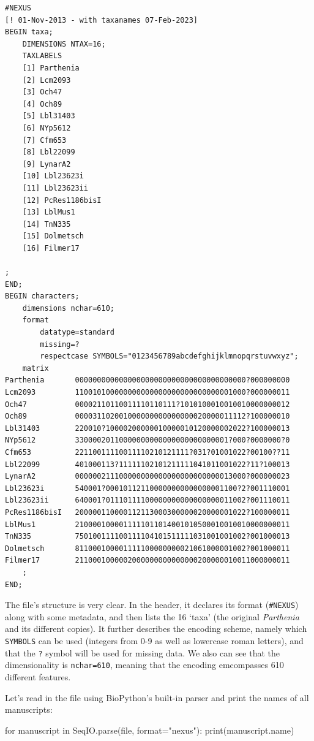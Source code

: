 \documentclass[
  a4paperpaper,
  ,captions=tableheading
]{scrbook}
\newenvironment{Shaded}{\begin{snugshade}}{\end{snugshade}}
\newcommand{\BuiltInTok}[1]{\textcolor[rgb]{0.00,0.23,0.31}{#1}}
\newcommand{\ControlFlowTok}[1]{\textcolor[rgb]{0.00,0.23,0.31}{#1}}
\newcommand{\KeywordTok}[1]{\textcolor[rgb]{0.00,0.23,0.31}{#1}}
\newcommand{\NormalTok}[1]{\textcolor[rgb]{0.00,0.23,0.31}{#1}}
\newcommand{\OperatorTok}[1]{\textcolor[rgb]{0.37,0.37,0.37}{#1}}
\newcommand{\StringTok}[1]{\textcolor[rgb]{0.13,0.47,0.30}{#1}}
\begin{document}
\begin{verbatim}
#NEXUS
[! 01-Nov-2013 - with taxanames 07-Feb-2023]
BEGIN taxa;
    DIMENSIONS NTAX=16;
    TAXLABELS
    [1] Parthenia
    [2] Lcm2093
    [3] Och47
    [4] Och89
    [5] Lbl31403
    [6] NYp5612
    [7] Cfm653
    [8] Lbl22099
    [9] LynarA2
    [10] Lbl23623i
    [11] Lbl23623ii
    [12] PcRes1186bisI
    [13] LblMus1
    [14] TnN335
    [15] Dolmetsch
    [16] Filmer17
    
;
END;
BEGIN characters;
    dimensions nchar=610;
    format
        datatype=standard
        missing=?
        respectcase SYMBOLS="0123456789abcdefghijklmnopqrstuvwxyz";
    matrix
Parthenia       000000000000000000000000000000000000000?000000000
Lcm2093         110010100000000000000000000000000001000?000000011
Och47           00002110110011110110111?1010100010010010000000012
Och89           000031102001000000000000000020000011112?100000010
Lbl31403        220010?10000200000010000010120000002022?100000013
NYp5612         33000020110000000000000000000000001?000?0000000?0
Cfm653          22110011110011110210121111?031?01001022?00100??11
Lbl22099        401000113?11111102101211111041011001022?11?100013
LynarA2         000000211100000000000000000000000013000?000000023
Lbl23623i       540001?000101121100000000000000001100?2?001110001
Lbl23623ii      640001?01110111100000000000000000011002?001110011
PcRes1186bisI   200000110000112113000300000020000001022?100000011
LblMus1         2100001000011111011014001010500010010010000000011
TnN335          750100111100111104101511111031001001002?001000013
Dolmetsch       811000100001111100000000021061000001002?001000011
Filmer17        2110001000002000000000000000200000010011000000011
    ;
END;
\end{verbatim}

The file's structure is very clear. In the header, it declares its
format (\texttt{\#NEXUS}) along with some metadata, and then lists the
16 `taxa' (the original \emph{Parthenia} and its different copies). It
further describes the encoding scheme, namely which \texttt{SYMBOLS} can
be used (integers from 0-9 as well as lowercase roman letters), and that
the \texttt{?} symbol will be used for missing data. We also can see
that the dimensionality is \texttt{nchar=610}, meaning that the encoding
emcompasses 610 different features.

Let's read in the file using BioPython's built-in parser and print the
names of all manuscripts:

\begin{Shaded}
\begin{Highlighting}[]
\ControlFlowTok{for}\NormalTok{ manuscript }\KeywordTok{in}\NormalTok{ SeqIO.parse(}\BuiltInTok{file}\NormalTok{, }\BuiltInTok{format}\OperatorTok{=}\StringTok{"nexus"}\NormalTok{):}
    \BuiltInTok{print}\NormalTok{(manuscript.name) }
\end{Highlighting}
\end{Shaded}
\end{document}
